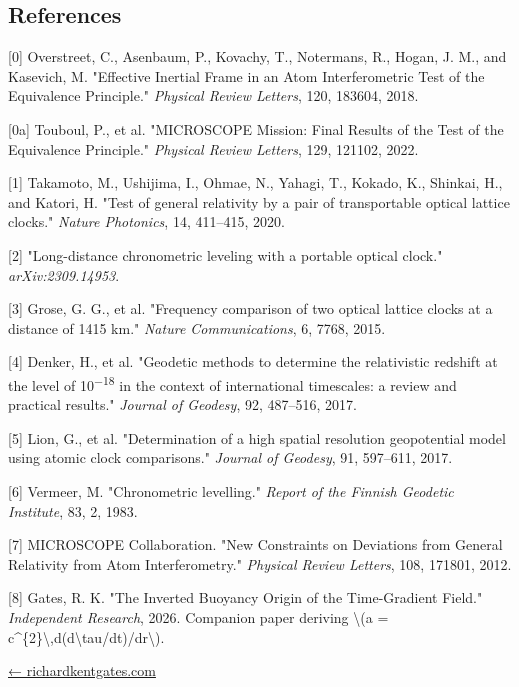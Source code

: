 \documentclass[
  10pt,
]{article}
\begin{document}
\hypertarget{references}{%
\subsection{References}\label{references}}

{[}0{]} Overstreet, C., Asenbaum, P., Kovachy, T., Notermans, R., Hogan,
J. M., and Kasevich, M. "Effective Inertial Frame in an Atom
Interferometric Test of the Equivalence Principle." \emph{Physical
Review Letters}, 120, 183604, 2018.

{[}0a{]} Touboul, P., et al. "MICROSCOPE Mission: Final Results of the
Test of the Equivalence Principle." \emph{Physical Review Letters}, 129,
121102, 2022.

{[}1{]} Takamoto, M., Ushijima, I., Ohmae, N., Yahagi, T., Kokado, K.,
Shinkai, H., and Katori, H. "Test of general relativity by a pair of
transportable optical lattice clocks." \emph{Nature Photonics}, 14,
411--415, 2020.

{[}2{]} "Long-distance chronometric leveling with a portable optical
clock." \emph{arXiv:2309.14953}.

{[}3{]} Grose, G. G., et al. "Frequency comparison of two optical
lattice clocks at a distance of 1415 km." \emph{Nature Communications},
6, 7768, 2015.

{[}4{]} Denker, H., et al. "Geodetic methods to determine the
relativistic redshift at the level of 10\textsuperscript{−18} in the
context of international timescales: a review and practical results."
\emph{Journal of Geodesy}, 92, 487--516, 2017.

{[}5{]} Lion, G., et al. "Determination of a high spatial resolution
geopotential model using atomic clock comparisons." \emph{Journal of
Geodesy}, 91, 597--611, 2017.

{[}6{]} Vermeer, M. "Chronometric levelling." \emph{Report of the
Finnish Geodetic Institute}, 83, 2, 1983.

{[}7{]} MICROSCOPE Collaboration. "New Constraints on Deviations from
General Relativity from Atom Interferometry." \emph{Physical Review
Letters}, 108, 171801, 2012.

{[}8{]} Gates, R. K. "The Inverted Buoyancy Origin of the Time-Gradient
Field." \emph{Independent Research}, 2026. Companion paper deriving
\textbackslash(a =
c\^{}\{2\}\textbackslash,d(d\textbackslash tau/dt)/dr\textbackslash).

\href{https://richardkentgates.com/}{← richardkentgates.com}
\end{document}
